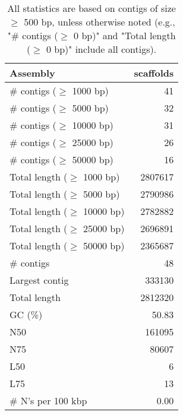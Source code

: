 \documentclass[12pt,a4paper]{article}
\begin{document}
\begin{table}[ht]
\begin{center}
\caption{All statistics are based on contigs of size $\geq$ 500 bp, unless otherwise noted (e.g., "\# contigs ($\geq$ 0 bp)" and "Total length ($\geq$ 0 bp)" include all contigs).}
\begin{tabular}{|l*{1}{|r}|}
\hline
Assembly & scaffolds \\ \hline
\# contigs ($\geq$ 1000 bp) & 41 \\ \hline
\# contigs ($\geq$ 5000 bp) & 32 \\ \hline
\# contigs ($\geq$ 10000 bp) & 31 \\ \hline
\# contigs ($\geq$ 25000 bp) & 26 \\ \hline
\# contigs ($\geq$ 50000 bp) & 16 \\ \hline
Total length ($\geq$ 1000 bp) & 2807617 \\ \hline
Total length ($\geq$ 5000 bp) & 2790986 \\ \hline
Total length ($\geq$ 10000 bp) & 2782882 \\ \hline
Total length ($\geq$ 25000 bp) & 2696891 \\ \hline
Total length ($\geq$ 50000 bp) & 2365687 \\ \hline
\# contigs & 48 \\ \hline
Largest contig & 333130 \\ \hline
Total length & 2812320 \\ \hline
GC (\%) & 50.83 \\ \hline
N50 & 161095 \\ \hline
N75 & 80607 \\ \hline
L50 & 6 \\ \hline
L75 & 13 \\ \hline
\# N's per 100 kbp & 0.00 \\ \hline
\end{tabular}
\end{center}
\end{table}
\end{document}
